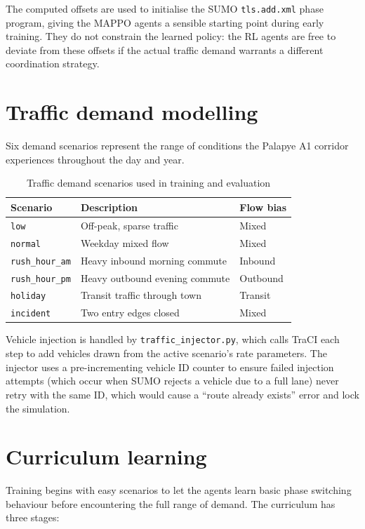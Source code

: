 ﻿\documentclass[11pt, a4paper]{report}
\begin{document}
The computed offsets are used to initialise the SUMO \texttt{tls.add.xml} phase program, giving the MAPPO agents a sensible starting point during early training. They do not constrain the learned policy: the RL agents are free to deviate from these offsets if the actual traffic demand warrants a different coordination strategy.

\section{Traffic demand modelling}

Six demand scenarios represent the range of conditions the Palapye A1 corridor experiences throughout the day and year.

\begin{table}[H]
\centering
\caption{Traffic demand scenarios used in training and evaluation}
\label{tab:scenarios}
\begin{tabular}{lll}
\toprule
\textbf{Scenario} & \textbf{Description} & \textbf{Flow bias} \\
\midrule
\texttt{low} & Off-peak, sparse traffic & Mixed \\
\texttt{normal} & Weekday mixed flow & Mixed \\
\texttt{rush\_hour\_am} & Heavy inbound morning commute & Inbound \\
\texttt{rush\_hour\_pm} & Heavy outbound evening commute & Outbound \\
\texttt{holiday} & Transit traffic through town & Transit \\
\texttt{incident} & Two entry edges closed & Mixed \\
\bottomrule
\end{tabular}
\end{table}

Vehicle injection is handled by \texttt{traffic\_injector.py}, which calls TraCI each step to add vehicles drawn from the active scenario's rate parameters. The injector uses a pre-incrementing vehicle ID counter to ensure failed injection attempts (which occur when SUMO rejects a vehicle due to a full lane) never retry with the same ID, which would cause a ``route already exists'' error and lock the simulation.

\section{Curriculum learning}

Training begins with easy scenarios to let the agents learn basic phase switching behaviour before encountering the full range of demand. The curriculum has three stages:
\end{document}
